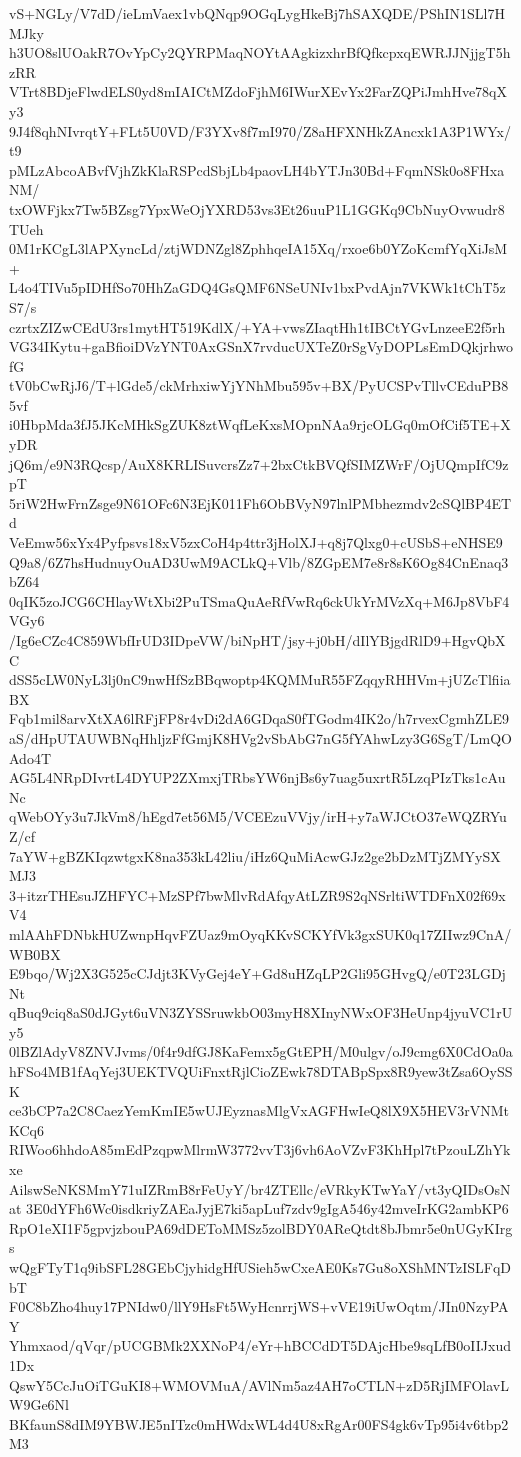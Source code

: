vS+NGLy/V7dD/ieLmVaex1vbQNqp9OGqLygHkeBj7hSAXQDE/PShIN1SLl7HMJky
h3UO8slUOakR7OvYpCy2QYRPMaqNOYtAAgkizxhrBfQfkcpxqEWRJJNjjgT5hzRR
VTrt8BDjeFlwdELS0yd8mIAICtMZdoFjhM6IWurXEvYx2FarZQPiJmhHve78qXy3
9J4f8qhNIvrqtY+FLt5U0VD/F3YXv8f7mI970/Z8aHFXNHkZAncxk1A3P1WYx/t9
pMLzAbcoABvfVjhZkKlaRSPcdSbjLb4paovLH4bYTJn30Bd+FqmNSk0o8FHxaNM/
txOWFjkx7Tw5BZsg7YpxWeOjYXRD53vs3Et26uuP1L1GGKq9CbNuyOvwudr8TUeh
0M1rKCgL3lAPXyncLd/ztjWDNZgl8ZphhqeIA15Xq/rxoe6b0YZoKcmfYqXiJsM+
L4o4TIVu5pIDHfSo70HhZaGDQ4GsQMF6NSeUNIv1bxPvdAjn7VKWk1tChT5zS7/s
czrtxZIZwCEdU3rs1mytHT519KdlX/+YA+vwsZIaqtHh1tIBCtYGvLnzeeE2f5rh
VG34IKytu+gaBfioiDVzYNT0AxGSnX7rvducUXTeZ0rSgVyDOPLsEmDQkjrhwofG
tV0bCwRjJ6/T+lGde5/ckMrhxiwYjYNhMbu595v+BX/PyUCSPvTllvCEduPB85vf
i0HbpMda3fJ5JKcMHkSgZUK8ztWqfLeKxsMOpnNAa9rjcOLGq0mOfCif5TE+XyDR
jQ6m/e9N3RQcsp/AuX8KRLISuvcrsZz7+2bxCtkBVQfSIMZWrF/OjUQmpIfC9zpT
5riW2HwFrnZsge9N61OFc6N3EjK011Fh6ObBVyN97lnlPMbhezmdv2cSQlBP4ETd
VeEmw56xYx4Pyfpsvs18xV5zxCoH4p4ttr3jHolXJ+q8j7Qlxg0+cUSbS+eNHSE9
Q9a8/6Z7hsHudnuyOuAD3UwM9ACLkQ+Vlb/8ZGpEM7e8r8sK6Og84CnEnaq3bZ64
0qIK5zoJCG6CHlayWtXbi2PuTSmaQuAeRfVwRq6ckUkYrMVzXq+M6Jp8VbF4VGy6
/Ig6eCZc4C859WbfIrUD3IDpeVW/biNpHT/jsy+j0bH/dIlYBjgdRlD9+HgvQbXC
dSS5cLW0NyL3lj0nC9nwHfSzBBqwoptp4KQMMuR55FZqqyRHHVm+jUZcTlfiiaBX
Fqb1mil8arvXtXA6lRFjFP8r4vDi2dA6GDqaS0fTGodm4IK2o/h7rvexCgmhZLE9
aS/dHpUTAUWBNqHhljzFfGmjK8HVg2vSbAbG7nG5fYAhwLzy3G6SgT/LmQOAdo4T
AG5L4NRpDIvrtL4DYUP2ZXmxjTRbsYW6njBs6y7uag5uxrtR5LzqPIzTks1cAuNc
qWebOYy3u7JkVm8/hEgd7et56M5/VCEEzuVVjy/irH+y7aWJCtO37eWQZRYuZ/cf
7aYW+gBZKIqzwtgxK8na353kL42liu/iHz6QuMiAcwGJz2ge2bDzMTjZMYySXMJ3
3+itzrTHEsuJZHFYC+MzSPf7bwMlvRdAfqyAtLZR9S2qNSrltiWTDFnX02f69xV4
mlAAhFDNbkHUZwnpHqvFZUaz9mOyqKKvSCKYfVk3gxSUK0q17ZIIwz9CnA/WB0BX
E9bqo/Wj2X3G525cCJdjt3KVyGej4eY+Gd8uHZqLP2Gli95GHvgQ/e0T23LGDjNt
qBuq9ciq8aS0dJGyt6uVN3ZYSSruwkbO03myH8XInyNWxOF3HeUnp4jyuVC1rUy5
0lBZlAdyV8ZNVJvms/0f4r9dfGJ8KaFemx5gGtEPH/M0ulgv/oJ9cmg6X0CdOa0a
hFSo4MB1fAqYej3UEKTVQUiFnxtRjlCioZEwk78DTABpSpx8R9yew3tZsa6OySSK
ce3bCP7a2C8CaezYemKmIE5wUJEyznasMlgVxAGFHwIeQ8lX9X5HEV3rVNMtKCq6
RIWoo6hhdoA85mEdPzqpwMlrmW3772vvT3j6vh6AoVZvF3KhHpl7tPzouLZhYkxe
AilswSeNKSMmY71uIZRmB8rFeUyY/br4ZTEllc/eVRkyKTwYaY/vt3yQIDsOsNat
3E0dYFh6Wc0isdkriyZAEaJyjE7ki5apLuf7zdv9gIgA546y42mveIrKG2ambKP6
RpO1eXI1F5gpvjzbouPA69dDEToMMSz5zolBDY0AReQtdt8bJbmr5e0nUGyKIrgs
wQgFTyT1q9ibSFL28GEbCjyhidgHfUSieh5wCxeAE0Ks7Gu8oXShMNTzISLFqDbT
F0C8bZho4huy17PNIdw0/llY9HsFt5WyHcnrrjWS+vVE19iUwOqtm/JIn0NzyPAY
Yhmxaod/qVqr/pUCGBMk2XXNoP4/eYr+hBCCdDT5DAjcHbe9sqLfB0oIIJxud1Dx
QswY5CcJuOiTGuKI8+WMOVMuA/AVlNm5az4AH7oCTLN+zD5RjIMFOlavLW9Ge6Nl
BKfaunS8dIM9YBWJE5nITzc0mHWdxWL4d4U8xRgAr00FS4gk6vTp95i4v6tbp2M3
